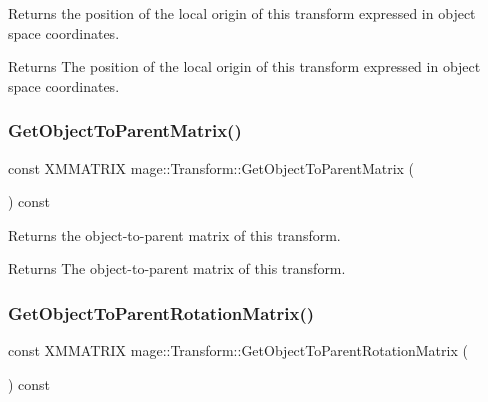Returns the position of the local origin of this transform expressed in object space coordinates.

\begin{DoxyReturn}{Returns}
The position of the local origin of this transform expressed in object space coordinates. 
\end{DoxyReturn}
\hypertarget{classmage_1_1_transform_a1171e7ebcdaea6329871a3c8946dbfe6}{}\label{classmage_1_1_transform_a1171e7ebcdaea6329871a3c8946dbfe6} 
\subsubsection{\texorpdfstring{Get\+Object\+To\+Parent\+Matrix()}{GetObjectToParentMatrix()}}
{\footnotesize\ttfamily const X\+M\+M\+A\+T\+R\+IX mage\+::\+Transform\+::\+Get\+Object\+To\+Parent\+Matrix (\begin{DoxyParamCaption}{ }\end{DoxyParamCaption}) const\hspace{0.3cm}{\ttfamily [noexcept]}}

Returns the object-\/to-\/parent matrix of this transform.

\begin{DoxyReturn}{Returns}
The object-\/to-\/parent matrix of this transform. 
\end{DoxyReturn}
\hypertarget{classmage_1_1_transform_a33204680aad4ec80d99e1f3747a0ee2b}{}\label{classmage_1_1_transform_a33204680aad4ec80d99e1f3747a0ee2b} 
\subsubsection{\texorpdfstring{Get\+Object\+To\+Parent\+Rotation\+Matrix()}{GetObjectToParentRotationMatrix()}}
{\footnotesize\ttfamily const X\+M\+M\+A\+T\+R\+IX mage\+::\+Transform\+::\+Get\+Object\+To\+Parent\+Rotation\+Matrix (\begin{DoxyParamCaption}{ }\end{DoxyParamCaption}) const\hspace{0.3cm}{\ttfamily [noexcept]}}

